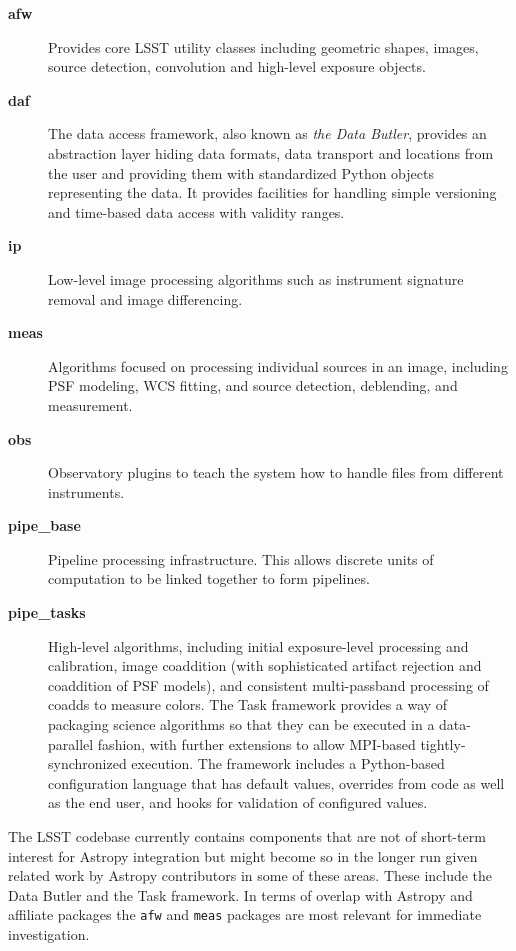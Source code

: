 \documentclass[]{spie}  %
\begin{document}
\begin{description}
\item[\textbf{afw}] Provides core LSST utility classes including geometric shapes, images, source detection, convolution and high-level exposure objects.

\item[\textbf{daf}] The data access framework, also known as \emph{the Data Butler}, provides an abstraction layer hiding data formats, data transport and locations from the user and providing them with standardized Python objects representing the data.
It provides facilities for handling simple versioning and time-based data access with validity ranges.

\item[\textbf{ip}] Low-level image processing algorithms such as instrument signature removal and image differencing.

\item[\textbf{meas}] Algorithms focused on processing individual sources in an image, including PSF modeling, WCS fitting, and source detection, deblending, and measurement.

\item[\textbf{obs}] Observatory plugins to teach the system how to handle files from different instruments.

\item[\textbf{pipe\_base}] Pipeline processing infrastructure. This allows discrete units of computation to be linked together to form pipelines.

\item[\textbf{pipe\_tasks}] High-level algorithms, including initial exposure-level processing and calibration, image coaddition (with sophisticated artifact rejection and coaddition of PSF models), and consistent multi-passband processing of coadds to measure colors.
The Task framework provides a way of packaging science algorithms so that they can be executed in a data-parallel fashion, with further extensions to allow MPI-based tightly-synchronized execution.
The framework includes a Python-based configuration language that has default values, overrides from code as well as the end user, and hooks for validation of configured values.

\end{description}

The LSST codebase currently contains components that are not of short-term interest for Astropy integration but might become so in the longer run given related work by Astropy contributors in some of these areas\cite{2016-PyAstro-Turner,2016_O12.3_adassxxv}.
These include the Data Butler and the Task framework.
In terms of overlap with Astropy and affiliate packages the \texttt{afw} and \texttt{meas} packages are most relevant for immediate investigation.
\end{document}
